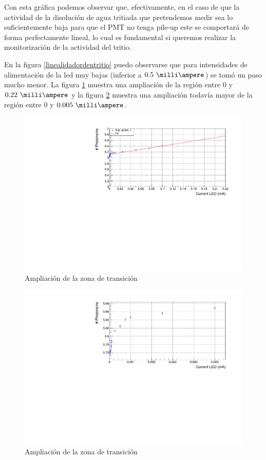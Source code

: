 Con esta gráfica podemos observar que, efectivamente, en el caso de que la actividad de la disolución de agua tritiada que pretendemos medir sea lo suficientemente baja para que el PMT no tenga pile-up este se comportará de forma perfectamente lineal, lo cual es fundamental si queremos realizar la monitorización de la actividad del tritio.

En la figura \ref{linealidadordentritio} puedo observarse que para intensidades de alimentación de la led muy bajas (inferior a $0.5~\milli\ampere$) se tomó un paso mucho menor. La figura \ref{zoomtransicion} muestra una ampliación de la región entre $0$ y $0.22~\milli\ampere$ y la figura \ref{zoomtransicion2} muestra una ampliación todavía mayor de la región entre $0$ y $0.005~\milli\ampere$.

\begin{figure}[H]
\centering
\includegraphics[scale=0.7]{Figuras/Transicionbackground.pdf}
\caption{Ampliación de la zona de transición\label{zoomtransicion}}
\end{figure}

\begin{figure}[H]
\centering
\includegraphics[scale=0.7]{Figuras/Transicionbackground2.pdf}
\caption{Ampliación de la zona de transición\label{zoomtransicion2}}
\end{figure}

